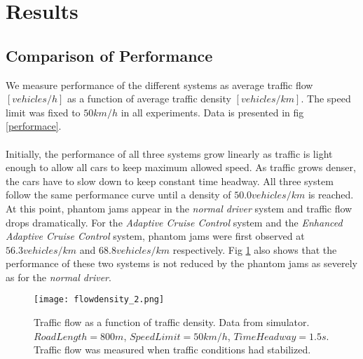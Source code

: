 \section{Results}

\subsection{Comparison of Performance}
We measure performance of the different systems as average traffic flow
$[\unit{vehicles/h}]$ as a function of average traffic density
$[\unit{vehicles/km}]$. The speed limit was fixed to $50 \unit{km/h}$ in all
experiments. Data is presented in fig \ref{performace}.\\\\

Initially, the performance of all three systems grow linearly as traffic is
light enough to allow all cars to keep maximum allowed speed. As traffic grows
denser, the cars have to slow down to keep constant time headway. All three
system follow the same performance curve until a density of $50.0
\unit{vehicles/km}$ is reached. At this point, phantom jams appear in the
\emph{normal driver} system and traffic flow drops dramatically. For the
\emph{Adaptive Cruise Control} system and the \emph{Enhanced Adaptive Cruise
Control} system, phantom jams were first observed at $56.3 \unit{vehicles/km}$
and $68.8 \unit{vehicles/km}$ respectively. Fig \ref{performance} also shows
that the performance of these two systems is not reduced by the phantom jams
as severely as for the \emph{normal driver}.

\begin{figure}[h!]
    \begin{center}
    \texttt{[image: flowdensity\_2.png]}
    \caption{\label{performance}
Traffic flow as a function of traffic density. Data from simulator.
$RoadLength=800 \unit{m}$, $SpeedLimit=50 \unit{km/h}$, $TimeHeadway=1.5
\unit{s}$. Traffic flow was measured when traffic conditions had stabilized.}
    \end{center}
\end{figure}


